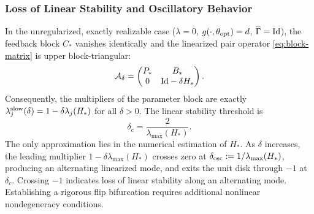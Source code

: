\subsubsection{Loss of Linear Stability and Oscillatory Behavior}
\label{sec:loss-of-stability}

In the unregularized, exactly realizable case ($\lambda=0$, $g(\cdot,\theta_{\rm opt})=d$, $\widehat{\Gamma}=\mathrm{Id}$), the feedback block $C_*$ vanishes identically and the linearized pair operator \eqref{eq:block-matrix} is upper block-triangular:
\begin{equation}
    \mathcal{A}_\delta = \begin{pmatrix} P_* & B_* \\ 0 & \mathrm{Id} - \delta H_* \end{pmatrix}.
\end{equation}
Consequently, the multipliers of the parameter block are exactly $\lambda_j^{\rm slow}(\delta) = 1 - \delta \lambda_j(H_*)$ for all $\delta > 0$. The linear stability threshold is
\begin{equation}
    \delta_c = \frac{2}{\lambda_{\max}(H_*)}.
\end{equation}
The only approximation lies in the numerical estimation of $H_*$. As $\delta$ increases, the leading multiplier $1 - \delta\lambda_{\max}(H_*)$ crosses zero at $\delta_{\rm osc} := 1/\lambda_{\max}(H_*)$, producing an alternating linearized mode, and exits the unit disk through $-1$ at $\delta_c$. Crossing $-1$ indicates loss of linear stability along an alternating mode. Establishing a rigorous flip bifurcation requires additional nonlinear nondegeneracy conditions.


